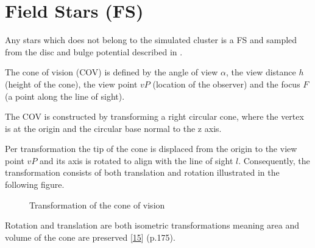\documentclass[letterpaper,10pt,english]{sphinxmanual}
\begin{document}
\section{Field Stars (FS)}
\label{\detokenize{NBodySimulation/Initialization:field-stars-fs}}
\sphinxAtStartPar
Any stars which does not belong to the simulated cluster is a FS and sampled from the disc and bulge potential described in {\hyperref[\detokenize{NBodySimulation/Potential:galactic-potential-label}]{}}.

\sphinxAtStartPar
The cone of vision (COV) is defined by the angle of view \(\alpha\), the view distance \(h\) (height of the cone), the view point \(vP\) (location of the observer) and the focus \(F\) (a point along the line of sight).

\sphinxAtStartPar
The COV is constructed by transforming a right circular cone, where the vertex is at the origin and the circular base normal to the z axis.

\sphinxAtStartPar
Per transformation the tip of the cone is displaced from the origin to the view point \(vP\) and its axis is rotated to align with the line of sight \(l\).
Consequently, the transformation consists of both translation and rotation illustrated in the following figure.

\begin{figure}[htbp]
\centering
\capstart

\noindent{}
\caption{Transformation of the cone of vision}\label{\detokenize{NBodySimulation/Initialization:id42}}\label{\detokenize{NBodySimulation/Initialization:fig-cone}}\end{figure}

\sphinxAtStartPar
Rotation and translation are both isometric transformations meaning area and volume of the cone are preserved {[}\hyperlink{cite.NBodySimulation/Appendix:id9}{15}{]} (p.175).
\end{document}
